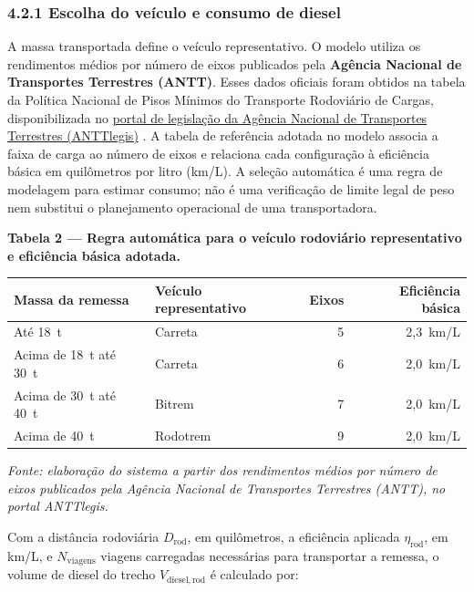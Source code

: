 \documentclass[brazil,]{article}
\let\oldsubsubsection\subsubsection
\renewcommand{\subsubsection}{\Needspace{10\baselineskip}\oldsubsubsection}
\newcommand{\keeptable}{\Needspace{0.64\textheight}}
\begin{document}
\hypertarget{escolha-do-veuxedculo-e-consumo-de-diesel}{%
\subsubsection{4.2.1 Escolha do veículo e consumo de
diesel}\label{escolha-do-veuxedculo-e-consumo-de-diesel}}

A massa transportada define o veículo representativo. O modelo utiliza
os rendimentos médios por número de eixos publicados pela
\textbf{Agência Nacional de Transportes Terrestres (ANTT)}. Esses dados
oficiais foram obtidos na tabela da Política Nacional de Pisos Mínimos
do Transporte Rodoviário de Cargas, disponibilizada no
\href{https://anttlegis.antt.gov.br/action/UrlPublicasAction.php?acao=abrirAtoPublico\&cod_menu=9230\&cod_modulo=623\&num_ato=00000001\&seq_ato=ATT\&sgl_orgao=SUROC\%2FANTT\%2FMT\&sgl_tipo=POR\&vlr_ano=2025}{portal
de legislação da Agência Nacional de Transportes Terrestres (ANTTlegis)}
\parencite{antt2025}. A tabela de referência adotada no
modelo associa a faixa de carga ao número de eixos e relaciona cada
configuração à eficiência básica em quilômetros por litro (km/L). A
seleção automática é uma regra de modelagem para estimar consumo; não é
uma verificação de limite legal de peso nem substitui o planejamento
operacional de uma transportadora.

\keeptable
\textbf{Tabela 2 --- Regra automática para o veículo rodoviário
representativo e eficiência básica adotada.}

\begin{longtable}[]{@{}llrr@{}}
\toprule
Massa da remessa & Veículo representativo & Eixos & Eficiência
básica\tabularnewline
\midrule
\endhead
Até 18~t & Carreta & 5 & 2,3~km/L\tabularnewline
Acima de 18~t até 30~t & Carreta & 6 & 2,0~km/L\tabularnewline
Acima de 30~t até 40~t & Bitrem & 7 & 2,0~km/L\tabularnewline
Acima de 40~t & Rodotrem & 9 & 2,0~km/L\tabularnewline
\bottomrule
\end{longtable}

\emph{Fonte: elaboração do sistema a partir dos rendimentos médios por
número de eixos publicados pela Agência Nacional de Transportes
Terrestres (ANTT), no portal ANTTlegis.}

Com a distância rodoviária \(D_{\mathrm{rod}}\), em quilômetros, a
eficiência aplicada \(\eta_{\mathrm{rod}}\), em km/L, e
\(N_{\mathrm{viagens}}\) viagens carregadas necessárias para transportar
a remessa, o volume de diesel do trecho \(V_{\mathrm{diesel,rod}}\) é
calculado por:
\end{document}
